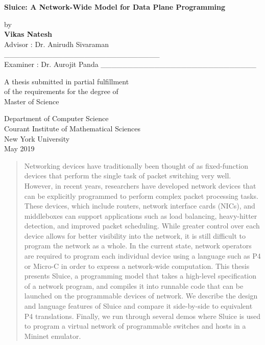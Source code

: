 \documentclass[12pt, oneside]{article}
\begin{document}
\doublespacing


\begin{titlepage}
    \begin{center}
        \vspace*{1cm}
 
        \Huge
        \textbf{Sluice: A Network-Wide Model for Data Plane Programming}
 
        \vspace{0.5cm}
        \Large
 
        \vspace{1.5cm}
 	by\\
        \textbf{Vikas Natesh}\\
 	Advisor : Dr. Anirudh Sivaraman    \_\_\_\_\_\_\_\_\_\_\_\_\_\_\_\_\_\_\_\_\_\_\_\_\_\_\_\_\_\\
	Examiner : Dr. Aurojit Panda \_\_\_\_\_\_\_\_\_\_\_\_\_\_\_\_\_\_\_\_\_\_\_\_\_\_\_\_\_
        \vfill
 
        \large
        A thesis submitted in partial fulfillment \\
        of the requirements for the degree of\\
		Master of Science
 
        \vspace{0.8cm}
  
        Department of Computer Science\\
        Courant Institute of Mathematical Sciences\\
        New York University\\
        May 2019
 
    \end{center}
\end{titlepage}

\begin{abstract}
Networking devices have traditionally been thought of as fixed-function devices that perform the single task of packet switching very well. However, in recent years, researchers have developed network devices that can be explicitly programmed to perform complex packet processing tasks. These devices, which include routers, network interface cards (NICs), and middleboxes can support applications such as load balancing, heavy-hitter detection, and improved packet scheduling. While greater control over each device allows for better visibility into the network, it is still difficult to program the network as a whole. In the current state, network operators are required to program each individual device using a language such as P4 or Micro-C in order to express a network-wide computation. This thesis presents Sluice, a programming model that takes a high-level specification of a network program, and compiles it into runnable code that can be launched on the programmable devices of network. We describe the design and language features of Sluice and compare it side-by-side to equivalent P4 translations. Finally, we run through several demos where Sluice is used to program a virtual network of programmable switches and hosts in a Mininet emulator.
\end{abstract}
\end{document}

